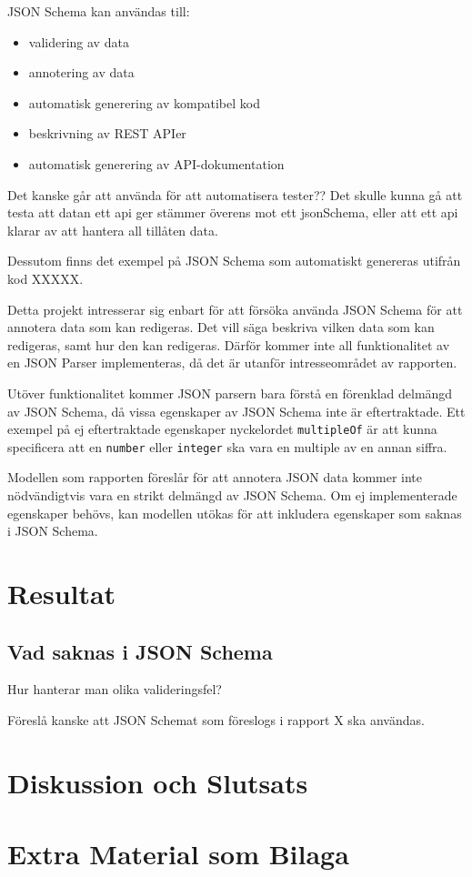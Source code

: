 \documentclass[swedish]{kththesis}
\begin{document}
JSON Schema kan användas till:
\begin{itemize}
	\item validering av data
	\item annotering av data
	\item automatisk generering av kompatibel kod
	\item beskrivning av REST APIer
	\item automatisk generering av API-dokumentation
\end{itemize}

Det kanske går att använda för att automatisera tester?? Det skulle kunna gå att testa att datan ett api ger stämmer överens mot ett jsonSchema, eller att ett api klarar av att hantera all tillåten data.

Dessutom finns det exempel på JSON Schema som automatiskt genereras utifrån kod XXXXX.

Detta projekt intresserar sig enbart för att försöka använda JSON Schema för att annotera data som kan redigeras. Det vill säga beskriva vilken data som kan redigeras, samt hur den kan redigeras. Därför kommer inte all funktionalitet av en JSON Parser implementeras, då det är utanför intresseområdet av rapporten.

Utöver funktionalitet kommer JSON parsern bara förstå en förenklad delmängd av JSON Schema, då vissa egenskaper av JSON Schema inte är eftertraktade. Ett exempel på ej eftertraktade egenskaper nyckelordet \texttt{multipleOf} är att kunna specificera att en \texttt{number} eller \texttt{integer} ska vara en multiple av en annan siffra.

Modellen som rapporten föreslår för att annotera JSON data kommer inte nödvändigtvis vara en strikt delmängd av JSON Schema. Om ej implementerade egenskaper behövs, kan modellen utökas för att inkludera egenskaper som saknas i JSON Schema.

\chapter{Resultat}

\section{Vad saknas i JSON Schema}
Hur hanterar man olika valideringsfel?

Föreslå kanske att JSON Schemat som föreslogs i rapport X ska användas.

\chapter{Diskussion och Slutsats}

\printbibliography[heading=bibintoc] %

\appendix

\chapter{Extra Material som Bilaga}
\end{document}
